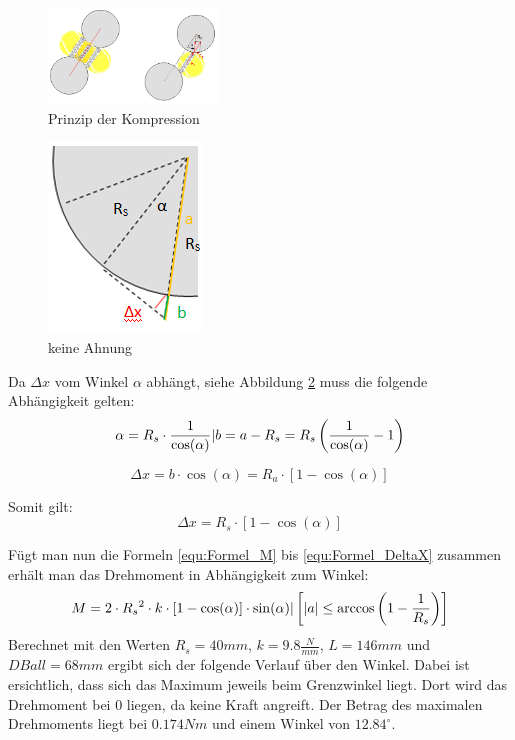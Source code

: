 \begin{figure}[h!]
	\centering
	\includegraphics[width=0.4\textwidth]{Enddokumentation/Anhang/Bilder/PrinzipKompression.png}
	\caption{Prinzip der Kompression}
	\label{fig:PrinzipBallKomp}
\end{figure}

\begin{figure}
    \includegraphics[scale=0.75]{Enddokumentation/Anhang/Bilder/GrafikKreisErkaerung.png}
    \centering
    \caption{keine Ahnung}
    \label{abb:KreisErkaerung}
\end{figure}
Da $\Delta x$ vom Winkel $\alpha$ abhängt, siehe Abbildung \ref{abb:KreisErkaerung} muss die folgende Abhängigkeit gelten:
\begin{equation}  
	\alpha = R_s \cdot \frac{1}{\cos(\alpha)} \\ \lvert \\ b = a - R_s = R_s \left( \frac{1}{\cos(\alpha)}-1\right)   
\end{equation}

\begin{equation}
	\Delta x = b \cdot \cos(\alpha) = R_a \cdot \left[1 - \cos(\alpha)\right]
\end{equation}

Somit gilt:
\begin{equation} 	\Delta x =  R_s \cdot \left[1 - \cos(\alpha)\right]
	\label{equ:Formel_DeltaX}
\end{equation}

Fügt man nun die Formeln \ref{equ:Formel_M} bis \ref{equ:Formel_DeltaX} zusammen erhält man das Drehmoment in Abhängigkeit zum Winkel:
\begin{equation}  
    M = 2 \cdot R_s{^{2}} \cdot k \cdot \left[1 - \cos(\alpha)\right] \cdot \sin(\alpha)\\\lvert\\ \left[ |a| \leq \arccos \left(1-\frac{1}{R_s}\right)\right]
\end{equation}
Berechnet mit den Werten $R_s = 40 mm$, $k = 9.8 \frac{N}{mm}$, $L = 146 mm$ und $DBall = 68 mm$ ergibt sich der folgende Verlauf über den Winkel. Dabei ist ersichtlich, dass sich das Maximum jeweils beim Grenzwinkel liegt. Dort wird das Drehmoment bei 0 liegen, da keine Kraft angreift. Der Betrag des maximalen Drehmoments liegt bei $0.174 Nm$ und einem Winkel von $12.84^\circ$.

